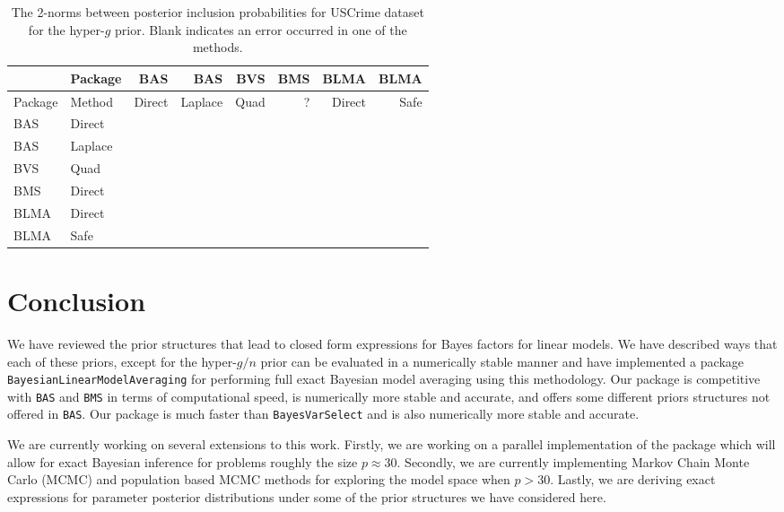 \documentclass{article}[12pt]
\begin{document}
\begin{table}[ht]
	\centering
{\small 
	\begin{tabular}{l|l|rrrrrr}
	&	Package & BAS       & BAS       & BVS        & BMS       & BLMA      & BLMA       \\
		\hline 
Package & Method  &  Direct    & Laplace   & Quad & ?         & Direct    & Safe      \\ 
\hline
BAS		& Direct  &            &           &      &           &           &           \\ 
BAS     & Laplace &            &           &      &           &           &           \\ 
BVS     & Quad    &            &           &      &           &           &           \\ 
BMS     & Direct  &            &           &      &           &           &           \\ 
BLMA    & Direct  &            &           &      &           &           &           \\ 
BLMA    & Safe    &            &           &      &           &           &           \\ 
	\end{tabular}
}
	\caption{The 2-norms between posterior inclusion probabilities for USCrime dataset 
	for the hyper-$g$ prior. Blank indicates an error occurred in one of the methods.}
	\label{tab:SummaryResults1}
\end{table}

 
 
\section{Conclusion}
\label{sec:conclusion}

We have reviewed the prior structures that lead to closed form expressions for Bayes factors for
linear models. We have described ways that each of these priors, except for the hyper-$g/n$ 
prior can be evaluated in a numerically stable manner and have implemented a package 
{\tt BayesianLinearModelAveraging} for performing full exact Bayesian model averaging using
this methodology. Our package is competitive with {\tt BAS} and {\tt BMS} in terms of computational speed,
is numerically more stable and accurate, and offers some different priors structures not
offered in {\tt BAS}. Our package is much faster than {\tt BayesVarSelect} and is also
numerically more stable and accurate.

We are currently working on several extensions to this work. Firstly, we are working on a
parallel implementation of the package which will allow for exact Bayesian inference for
problems roughly the size $p\approx 30$. Secondly, we are currently implementing  Markov
Chain Monte Carlo (MCMC) and population based MCMC methods for exploring the model space
when $p>30$. Lastly, we are deriving exact expressions for parameter posterior distributions
under some of the prior structures we have considered here.
\end{document}
